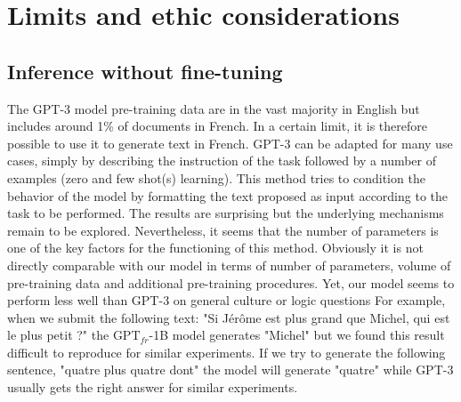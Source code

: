 \section{Limits and ethic considerations}

\subsection{Inference without fine-tuning}  

The GPT-3 model \parencite{brown_20} pre-training data are in the vast majority in English but includes around 1\% of documents in French. In a certain limit, it is therefore possible to use it to generate text in French. GPT-3 can be adapted for many use cases, simply by describing the instruction of the task followed by a number of examples (zero and few shot(s) learning). This method tries to condition the behavior of the model by formatting the text proposed as input according to the task to be performed. The results are surprising but the underlying mechanisms remain to be explored. Nevertheless, it seems that the number of parameters is one of the key factors for the functioning of this method. Obviously it is not directly comparable with our model in terms of number of parameters, volume of pre-training data and additional pre-training procedures. Yet, our model seems to perform less well than GPT-3 on general culture or logic questions
For example, when we submit the following text: "Si Jérôme est plus grand que Michel, qui est le plus petit ?"
the $\text{GPT}_{fr}$-1B model generates "Michel" but we found this result difficult to reproduce for similar experiments. If we try to generate the following sentence, "quatre plus quatre dont" the model will generate "quatre" while GPT-3 usually gets the right answer for similar experiments.

